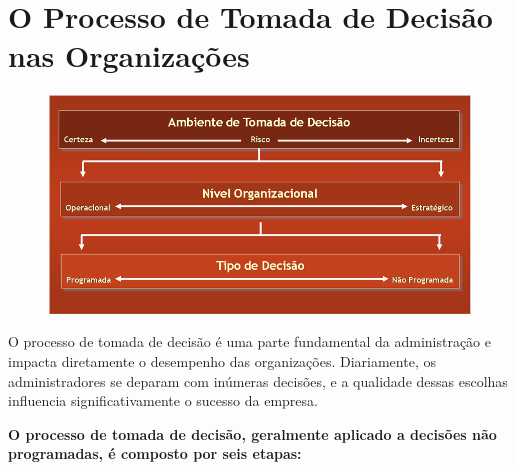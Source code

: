\section{O Processo de Tomada de Decisão nas Organizações}

\begin{figure}[H]  %
    \centering
    \begin{minipage}{0.6\textwidth}
        \centering
        \includegraphics[width=\textwidth]{img/imagem5.png}
        \label{fig:exemplo}
    \end{minipage}
\end{figure}

O processo de tomada de decisão é uma parte fundamental da administração e impacta diretamente o desempenho das organizações. Diariamente, os administradores se deparam com inúmeras decisões, e a qualidade dessas escolhas influencia significativamente o sucesso da empresa. 

\textbf{O processo de tomada de decisão, geralmente aplicado a decisões não programadas, é composto por seis etapas:}

